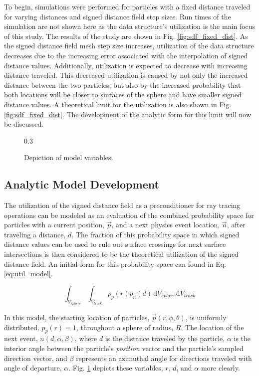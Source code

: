 To begin, simulations were performed for particles with a fixed distance
traveled for varying distances and signed distance field step sizes. Run times
of the simulation are not shown here as the data structure's utilization is the
main focus of this study. The results of the study are shown in
Fig. \ref{fig:sdf_fixed_dist}. As the signed distance field mesh step size
increases, utilization of the data structure decreases due to the increasing
error associated with the interpolation of signed distance values. Additionally,
utilization is expected to decrease with increasing distance traveled. This
decreased utilization is caused by not only the increased distance between the
two particles, but also by the increased probability that both locations will be
closer to surfaces of the sphere and have smaller signed distance values. A
theoretical limit for the utilization is also shown in
Fig. \ref{fig:sdf_fixed_dist}. The development of the analytic form for this
limit will now be discussed.

\begin{figure}[ht]
  \centering
  {0.3\textwidth}
  \caption{Depiction of model variables.}
  \label{fig:model}
\end{figure}

\subsection{Analytic Model Development}
  
The utilization of the signed distance field as a preconditioner for ray tracing
operations can be modeled as an evaluation of the combined probability space for
particles with a current position, $\vec{p}$, and a next physics event location,
$\vec{n}$, after traveling a distance, $d$. The fraction of this probability
space in which signed distance values can be used to rule out surface crossings
for next surface intersections is then considered to be the theoretical
utilization of the signed distance field. An initial form for this probability
space can found in Eq. \ref{eq:util_model}.

\begin{equation}
  \label{eq:util_model}
\int_{V_{sphere}}\int_{V_{track}} p_p(r) p_n(d) \, \mathrm{d}V_{sphere}\mathrm{d}V_{track}
\end{equation}

In this model, the starting location of particles, $\vec{p}(r,\phi,\theta)$, is
uniformly distributed, $p_p(r)=1$, throughout a sphere of radius, $R$.  The
location of the next event, $n(d,\alpha,\beta)$, where $d$ is the distance
traveled by the particle, $\alpha$ is the interior angle between the
particle's \textit{position} vector and the particle's sampled direction
vector, and $\beta$ represents an azimuthal angle for directions traveled with
angle of departure, $\alpha$. Fig. \ref{fig:model} depicts these
variables, $r$, $d$, and $\alpha$ more clearly.

